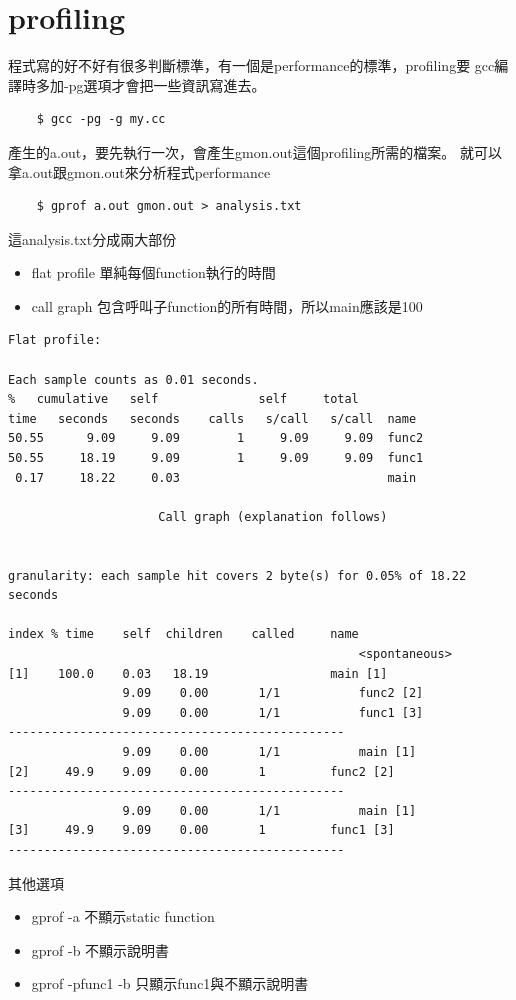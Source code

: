   \section{profiling}
    程式寫的好不好有很多判斷標準，有一個是performance的標準，profiling要
    gcc編譯時多加-pg選項才會把一些資訊寫進去。
    \begin{verbatim}
    $ gcc -pg -g my.cc
    \end{verbatim}
    產生的a.out，要先執行一次，會產生gmon.out這個profiling所需的檔案。
    就可以拿a.out跟gmon.out來分析程式performance
    \begin{verbatim}
    $ gprof a.out gmon.out > analysis.txt
    \end{verbatim}
    這analysis.txt分成兩大部份
    \begin{itemize}
      \item flat profile 單純每個function執行的時間
      \item call graph 包含呼叫子function的所有時間，所以main應該是100%
    \end{itemize}

    \begin{verbatim}
Flat profile:

Each sample counts as 0.01 seconds.
%   cumulative   self              self     total           
time   seconds   seconds    calls   s/call   s/call  name    
50.55      9.09     9.09        1     9.09     9.09  func2
50.55     18.19     9.09        1     9.09     9.09  func1
 0.17     18.22     0.03                             main

                     Call graph (explanation follows)


granularity: each sample hit covers 2 byte(s) for 0.05% of 18.22 seconds

index % time    self  children    called     name
                                                 <spontaneous>
[1]    100.0    0.03   18.19                 main [1]
                9.09    0.00       1/1           func2 [2]
                9.09    0.00       1/1           func1 [3]
-----------------------------------------------
                9.09    0.00       1/1           main [1]
[2]     49.9    9.09    0.00       1         func2 [2]
-----------------------------------------------
                9.09    0.00       1/1           main [1]
[3]     49.9    9.09    0.00       1         func1 [3]
-----------------------------------------------

    \end{verbatim}
    其他選項
    \begin{itemize}
      \item gprof -a 不顯示static function
      \item gprof -b 不顯示說明書
      \item gprof -pfunc1 -b 只顯示func1與不顯示說明書
    \end{itemize}

